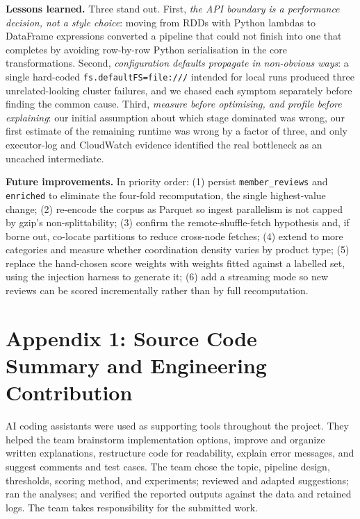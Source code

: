 \documentclass[12pt]{article}
\begin{document}
\textbf{Lessons learned.} Three stand out. First, \emph{the API boundary is a
performance decision, not a style choice}: moving from RDDs with Python lambdas
to DataFrame expressions converted a pipeline that could not finish into one
that completes by avoiding row-by-row Python serialisation in the core
transformations. Second, \emph{configuration defaults propagate in non-obvious ways}: a
single hard-coded \texttt{fs.defaultFS=file:///} intended for local runs
produced three unrelated-looking cluster failures, and we chased each symptom
separately before finding the common cause. Third, \emph{measure before
optimising, and profile before explaining}: our initial assumption about which
stage dominated was wrong, our first estimate of the remaining runtime was
wrong by a factor of three, and only executor-log and CloudWatch evidence
identified the real bottleneck as an uncached intermediate.

\textbf{Future improvements.} In priority order: (1) persist
\texttt{member\_reviews} and \texttt{enriched} to eliminate the four-fold
recomputation, the single highest-value change; (2) re-encode the corpus as
Parquet so ingest parallelism is not capped by gzip's non-splittability;
(3) confirm the remote-shuffle-fetch hypothesis and, if borne out, co-locate
partitions to reduce cross-node fetches; (4) extend to more categories and
measure whether coordination density varies by product type; (5) replace the
hand-chosen score weights with weights fitted against a labelled set, using
the injection harness to generate it; (6) add a streaming mode so new reviews
can be scored incrementally rather than by full recomputation.

\appendix

\section{Appendix 1: Source Code Summary and Engineering Contribution}

AI coding assistants were used as supporting tools throughout the project. They
helped the team brainstorm implementation options, improve and organize written
explanations, restructure code for readability, explain error messages, and
suggest comments and test cases. The team chose the topic, pipeline design,
thresholds, scoring method, and experiments; reviewed and adapted suggestions;
ran the analyses; and verified the reported outputs against the data and
retained logs. The team takes responsibility for the submitted work.
\end{document}
